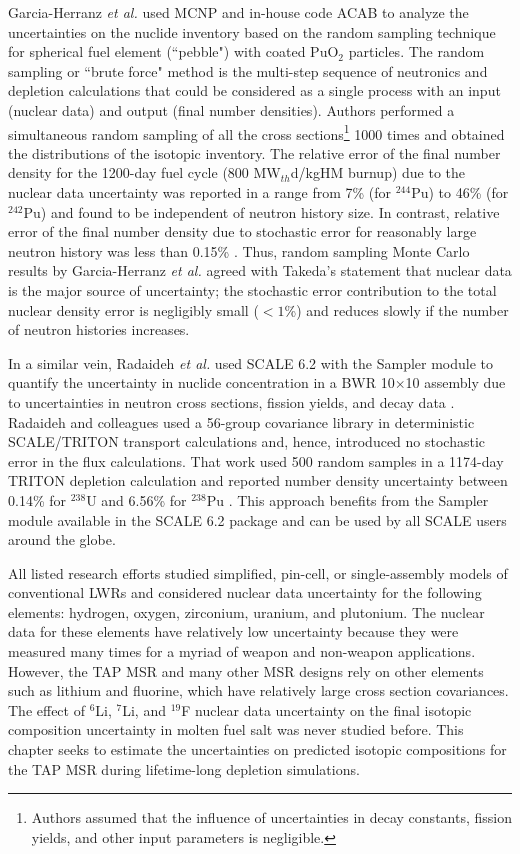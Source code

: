 Garcia-Herranz \emph{et al.} used MCNP and in-house code ACAB to analyze the 
uncertainties on the nuclide inventory based on the random sampling technique 
for spherical fuel element (``pebble") with coated PuO$_2$ particles. The 
random sampling or ``brute force" method is the multi-step 
sequence of neutronics and depletion calculations that could be considered 
as a single process with an input (nuclear data) and output (final number 
densities). Authors performed a simultaneous random sampling of all the cross 
sections\footnote{Authors assumed that the influence of uncertainties in decay 
constants, fission yields, and other input parameters is negligible.} 1000 
times and obtained the distributions of the isotopic inventory. The relative 
error of the final number density for the 1200-day fuel cycle (800 
MW$_{th}$d/kgHM burnup) due to the nuclear data uncertainty was reported in a 
range from 7\% (for $^{244}$Pu) to 46\% (for $^{242}$Pu) and found to be 
independent of neutron history size. 
In contrast, relative error of the final number density due to stochastic 
error for reasonably large neutron history was less than 0.15\% 
\cite{garcia-herranz_propagation_2008}. Thus, random sampling Monte Carlo 
results by Garcia-Herranz \emph{et al.} agreed with Takeda's statement that 
nuclear data is the major source of uncertainty; the stochastic error 
contribution to the total nuclear density error is negligibly small ($<1$\%) 
and reduces slowly if the number of neutron histories increases.

In a similar vein, Radaideh \emph{et al.} used SCALE 6.2 with the Sampler 
module
\cite{rearden_scale_2018} to quantify the uncertainty in nuclide concentration 
in a \gls{BWR} 10$\times$10 assembly due to uncertainties in neutron cross 
sections, fission yields, and decay data \cite{radaideh_using_2019-1}.  
Radaideh and colleagues used a 56-group covariance library in deterministic 
SCALE/TRITON transport calculations and, hence, introduced no stochastic error 
in the flux calculations. That work used 500 random samples in a 1174-day 
TRITON 
depletion calculation and reported number density uncertainty between 0.14\% 
for $^{238}$U and 6.56\% for $^{238}$Pu \cite{radaideh_combining_2019-1}. This 
approach benefits from the Sampler module available in the SCALE 6.2 package 
and can be used by all SCALE users around the globe.

All listed research efforts studied simplified, pin-cell, or single-assembly 
models of conventional \glspl{LWR} and considered nuclear data uncertainty for 
the following elements: hydrogen, oxygen, zirconium, uranium, and plutonium. 
The nuclear data for these elements have relatively low uncertainty because 
they were measured many times for a myriad of weapon and non-weapon 
applications. 
However, the \gls{TAP} \gls{MSR} and many other \gls{MSR} designs rely on 
other elements such as lithium and fluorine, which have relatively large cross 
section covariances. The effect of $^6$Li, $^7$Li, and $^{19}$F nuclear data 
uncertainty 
on the final isotopic composition uncertainty in molten fuel salt was never 
studied before. This chapter seeks to estimate the uncertainties on predicted 
isotopic compositions for the \gls{TAP} \gls{MSR} during lifetime-long 
depletion simulations.

